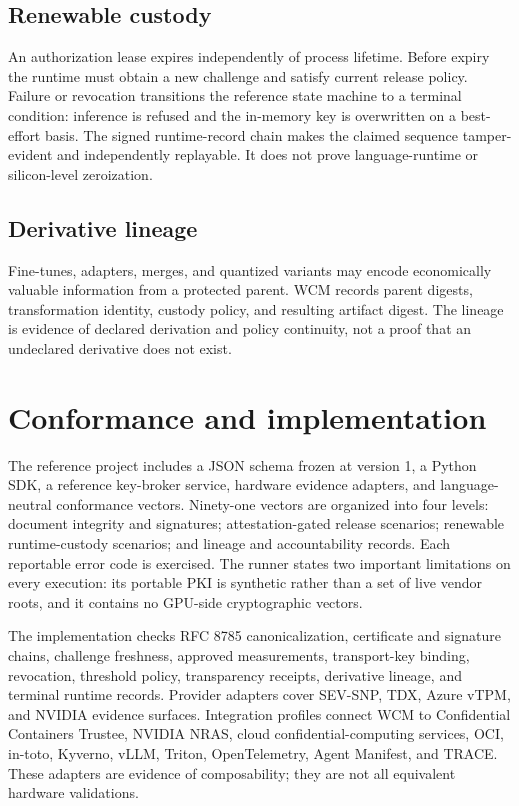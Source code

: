 \documentclass[10pt,letterpaper]{article}
\begin{document}
\subsection{Renewable custody}

An authorization lease expires independently of process lifetime. Before expiry the runtime must obtain a new challenge and satisfy current release policy. Failure or revocation transitions the reference state machine to a terminal condition: inference is refused and the in-memory key is overwritten on a best-effort basis. The signed runtime-record chain makes the claimed sequence tamper-evident and independently replayable. It does not prove language-runtime or silicon-level zeroization.

\subsection{Derivative lineage}

Fine-tunes, adapters, merges, and quantized variants may encode economically valuable information from a protected parent. WCM records parent digests, transformation identity, custody policy, and resulting artifact digest. The lineage is evidence of declared derivation and policy continuity, not a proof that an undeclared derivative does not exist.

\section{Conformance and implementation}

The reference project includes a JSON schema frozen at version 1, a Python SDK, a reference key-broker service, hardware evidence adapters, and language-neutral conformance vectors. Ninety-one vectors are organized into four levels: document integrity and signatures; attestation-gated release scenarios; renewable runtime-custody scenarios; and lineage and accountability records. Each reportable error code is exercised. The runner states two important limitations on every execution: its portable PKI is synthetic rather than a set of live vendor roots, and it contains no GPU-side cryptographic vectors.

The implementation checks RFC 8785 canonicalization, certificate and signature chains, challenge freshness, approved measurements, transport-key binding, revocation, threshold policy, transparency receipts, derivative lineage, and terminal runtime records. Provider adapters cover SEV-SNP, TDX, Azure vTPM, and NVIDIA evidence surfaces. Integration profiles connect WCM to Confidential Containers Trustee, NVIDIA NRAS, cloud confidential-computing services, OCI, in-toto, Kyverno, vLLM, Triton, OpenTelemetry, Agent Manifest, and TRACE. These adapters are evidence of composability; they are not all equivalent hardware validations.
\end{document}
